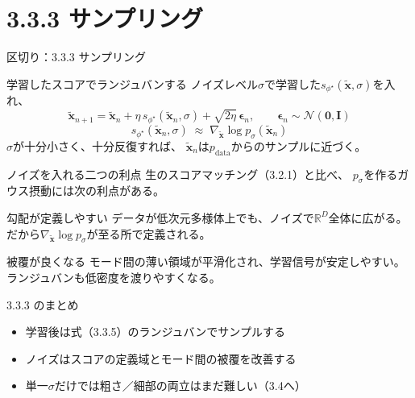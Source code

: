 \section{3.3.3 サンプリング}
\asmain
\begin{frame}{区切り：3.3.3 サンプリング}
    \tableofcontents[currentsection]
\end{frame}
\asmain
\begin{frame}{学習したスコアでランジュバンする}
    ノイズレベル$\sigma$で学習した$s_{\phi^\star}(\tilde{\bm{x}},\sigma)$を入れ、
    \[
        \tilde{\bm{x}}_{n+1}
        =
        \tilde{\bm{x}}_n
        +
        \eta\,s_{\phi^\star}(\tilde{\bm{x}}_n,\sigma)
        +
        \sqrt{2\eta}\,\bm{\epsilon}_n,
        \qquad
        \bm{\epsilon}_n\sim\mathcal{N}(\bm{0},\bm{I})
        \tag{3.3.5}
    \]
    \[
        s_{\phi^\star}(\tilde{\bm{x}}_n,\sigma)
        \;\approx\;
        \nabla_{\tilde{\bm{x}}}\log p_{\sigma}(\tilde{\bm{x}}_n)
    \]
    $\sigma$が十分小さく、十分反復すれば、
    $\tilde{\bm{x}}_n$は$p_{\mathrm{data}}$からのサンプルに近づく。
\end{frame}
\asmain
\begin{frame}{ノイズを入れる二つの利点}
    生のスコアマッチング（3.2.1）と比べ、
    $p_{\sigma}$を作るガウス摂動には次の利点がある。
    \begin{block}{勾配が定義しやすい}
        データが低次元多様体上でも、ノイズで$\mathbb{R}^{D}$全体に広がる。\\
        だから$\nabla_{\tilde{\bm{x}}}\log p_{\sigma}$が至る所で定義される。
    \end{block}
    \begin{block}{被覆が良くなる}
        モード間の薄い領域が平滑化され、学習信号が安定しやすい。\\
        ランジュバンも低密度を渡りやすくなる。
    \end{block}
\end{frame}
\asmain
\begin{frame}{3.3.3 のまとめ}
    \begin{itemize}
        \item 学習後は式（3.3.5）のランジュバンでサンプルする
        \item ノイズはスコアの定義域とモード間の被覆を改善する
        \item 単一$\sigma$だけでは粗さ／細部の両立はまだ難しい（3.4へ）
    \end{itemize}
\end{frame}
